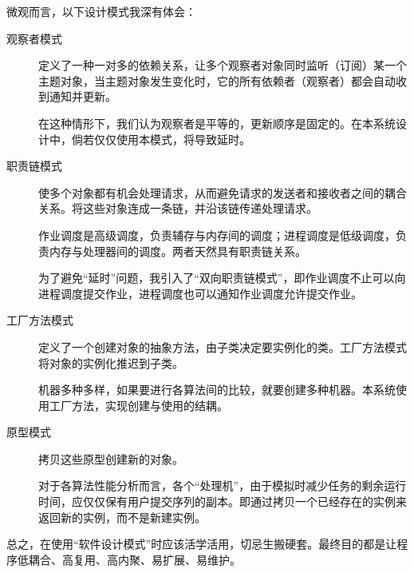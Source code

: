 \documentclass[12pt, a4paper, UTF8]{ctexart}
\begin{document}
微观而言，以下设计模式我深有体会：

\begin{description}
    \item[观察者模式] 定义了一种一对多的依赖关系，让多个观察者对象同时监听（订阅）某一个主题对象，当主题对象发生变化时，它的所有依赖者（观察者）都会自动收到通知并更新。

        在这种情形下，我们认为观察者是平等的，更新顺序是固定的。在本系统设计中，倘若仅仅使用本模式，将导致延时。

    \item[职责链模式] 使多个对象都有机会处理请求，从而避免请求的发送者和接收者之间的耦合关系。将这些对象连成一条链，并沿该链传递处理请求。

        作业调度是高级调度，负责辅存与内存间的调度；进程调度是低级调度，负责内存与处理器间的调度。两者天然具有职责链关系。

        为了避免“延时”问题，我引入了“双向职责链模式”，即作业调度不止可以向进程调度提交作业，进程调度也可以通知作业调度允许提交作业。

    \item[工厂方法模式] 定义了一个创建对象的抽象方法，由子类决定要实例化的类。工厂方法模式将对象的实例化推迟到子类。

        机器多种多样，如果要进行各算法间的比较，就要创建多种机器。本系统使用工厂方法，实现创建与使用的结耦。

    \item[原型模式] 拷贝这些原型创建新的对象。

        对于各算法性能分析而言，各个“处理机”，由于模拟时减少任务的剩余运行时间，应仅仅保有用户提交序列的副本。即通过拷贝一个已经存在的实例来返回新的实例，而不是新建实例。

\end{description}
总之，在使用“软件设计模式”时应该活学活用，切忌生搬硬套。最终目的都是让程序低耦合、高复用、高内聚、易扩展、易维护。
\end{document}
